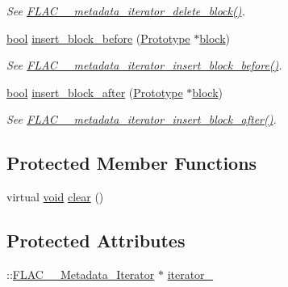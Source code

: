 \begin{DoxyCompactItemize}
\begin{DoxyCompactList}\small\item\em See \hyperlink{group__flac__metadata__level2_ga18fdaae4986696dc000cae6357810f7b}{F\+L\+A\+C\+\_\+\+\_\+metadata\+\_\+iterator\+\_\+delete\+\_\+block()}. \end{DoxyCompactList}\item 
\hyperlink{mac_2config_2i386_2lib-src_2libsoxr_2soxr-config_8h_abb452686968e48b67397da5f97445f5b}{bool} \hyperlink{class_f_l_a_c_1_1_metadata_1_1_iterator_a86de6d0b21ac08b74a2ea8c1a9adce36}{insert\+\_\+block\+\_\+before} (\hyperlink{class_f_l_a_c_1_1_metadata_1_1_prototype}{Prototype} $\ast$\hyperlink{structblock}{block})
\begin{DoxyCompactList}\small\item\em See \hyperlink{group__flac__metadata__level2_ga163c1b4d8fdd72c0d6fb8816b2ae9b18}{F\+L\+A\+C\+\_\+\+\_\+metadata\+\_\+iterator\+\_\+insert\+\_\+block\+\_\+before()}. \end{DoxyCompactList}\item 
\hyperlink{mac_2config_2i386_2lib-src_2libsoxr_2soxr-config_8h_abb452686968e48b67397da5f97445f5b}{bool} \hyperlink{class_f_l_a_c_1_1_metadata_1_1_iterator_a73e7a3f7192f369cb3a19d078da504ab}{insert\+\_\+block\+\_\+after} (\hyperlink{class_f_l_a_c_1_1_metadata_1_1_prototype}{Prototype} $\ast$\hyperlink{structblock}{block})
\begin{DoxyCompactList}\small\item\em See \hyperlink{group__flac__metadata__level2_ga2f9d8e02bd2e5ffb235af0b02d347d47}{F\+L\+A\+C\+\_\+\+\_\+metadata\+\_\+iterator\+\_\+insert\+\_\+block\+\_\+after()}. \end{DoxyCompactList}\end{DoxyCompactItemize}
\subsection*{Protected Member Functions}
\begin{DoxyCompactItemize}
\item 
virtual \hyperlink{sound_8c_ae35f5844602719cf66324f4de2a658b3}{void} \hyperlink{class_f_l_a_c_1_1_metadata_1_1_iterator_abd4629f2150edc1785c662b2a353f3fe}{clear} ()
\end{DoxyCompactItemize}
\subsection*{Protected Attributes}
\begin{DoxyCompactItemize}
\item 
\+::\hyperlink{struct_f_l_a_c_____metadata___iterator}{F\+L\+A\+C\+\_\+\+\_\+\+Metadata\+\_\+\+Iterator} $\ast$ \hyperlink{class_f_l_a_c_1_1_metadata_1_1_iterator_a23f991701a4a22781feeb2a1d658ed76}{iterator\+\_\+}
\end{DoxyCompactItemize}


